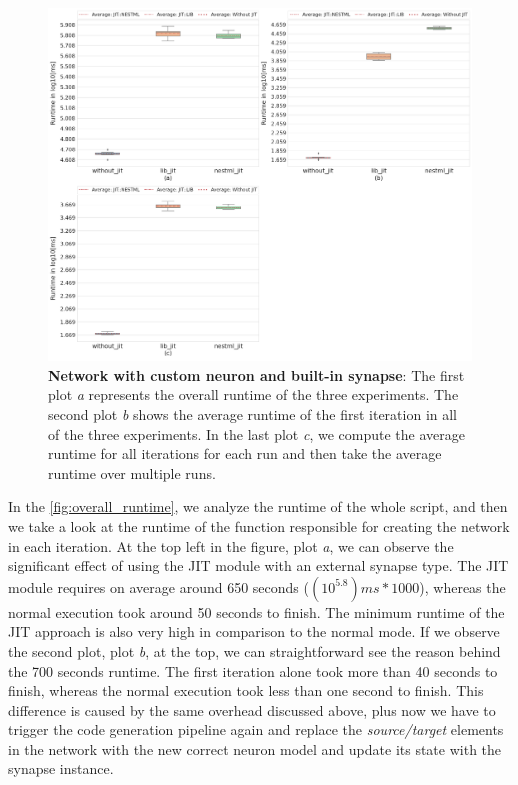 \begin{figure}[ht!]
    \centering
    \includegraphics[width=\textwidth]{src/pic/three_plots.png}
    \caption{\textbf{Network with custom neuron and built-in synapse}: The first plot \emph{a} represents the overall runtime of the three experiments. The second plot \emph{b} shows the average runtime of the first iteration in all of the three experiments. In the last plot \emph{c}, we compute the average runtime for all iterations for each run and then take the average runtime over multiple runs.}
    \label{fig:overall_runtime}
\end{figure}

In the \autoref{fig:overall_runtime}, we analyze the runtime of the whole script, and then we take a look at the runtime of the function responsible for creating the network in each iteration. At the top left in the figure, plot \emph{a}, we can observe the significant effect of using the JIT module with an external synapse type. The JIT module requires on average around 650 seconds ($(10^{5.8})ms * 1000$), whereas the normal execution took around 50 seconds to finish. The minimum runtime of the JIT approach is also very high in comparison to the normal mode. If we observe the second plot, plot \emph{b}, at the top, we can straightforward see the reason behind the 700 seconds runtime. The first iteration alone took more than 40 seconds to finish, whereas the normal execution took less than one second to finish. This difference is caused by the same overhead discussed above, plus now we have to trigger the code generation pipeline again and replace the \emph{source/target} elements in the network with the new correct neuron model and update its state with the synapse instance. 

